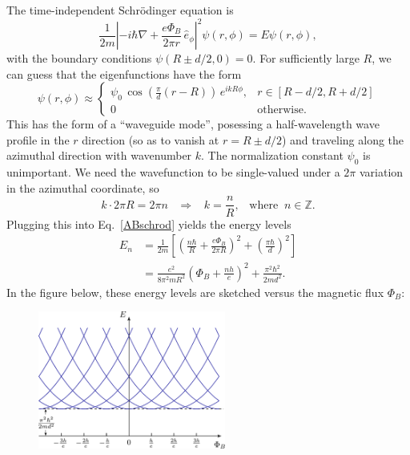 \documentclass[pra,12pt]{revtex4}
\begin{document}
The time-independent Schr\"odinger equation is
\begin{equation}
  \frac{1}{2m}\left|-i\hbar\nabla+
  \frac{e\Phi_B}{2\pi r} \, \hat{e}_\phi\right|^2 \psi(r,\phi)
  = E\psi(r,\phi),
  \label{ABschrod}
\end{equation}
with the boundary conditions $\psi(R\pm d/2,0) = 0$.  For sufficiently
large $R$, we can guess that the eigenfunctions have the form
\begin{equation}
  \psi(r,\phi) \approx
  \begin{cases}
  \psi_0 \, \cos\left(\frac{\pi}{d}(r-R)\right)\, e^{i k R \phi},
  & r \in [R-d/2, R + d/2] \\
  0 & \textrm{otherwise}.
  \end{cases}
\end{equation}
This has the form of a ``waveguide mode'', posessing a half-wavelength
wave profile in the $r$ direction (so as to vanish at $r = R \pm d/2$)
and traveling along the azimuthal direction with wavenumber $k$.  The
normalization constant $\psi_0$ is unimportant.  We need the
wavefunction to be single-valued under a $2\pi$ variation in the
azimuthal coordinate, so
\begin{equation}
  k \cdot 2\pi R = 2\pi n \;\;\;\Rightarrow \;\;\; k = \frac{n}{R},
  \;\;\;\mathrm{where}\;\; n \in \mathbb{Z}.
\end{equation}
Plugging this into Eq.~\eqref{ABschrod} yields the energy levels
\begin{align}
  E_n &= \frac{1}{2m} \left[
    \left(\frac{n\hbar}{R} + \frac{e\Phi_B}{2\pi R}\right)^2
    + \left(\frac{\pi\hbar}{d}\right)^2 \right] \\
  &= \frac{e^2}{8\pi^2mR^2} \left(\Phi_B + \frac{nh}{e} \right)^2
  + \frac{\pi^2\hbar^2}{2md^2}.
  \label{abcurves}
\end{align}
In the figure below, these energy levels are sketched versus the
magnetic flux $\Phi_B$:

\begin{figure}[h]
  \centering\includegraphics[width=0.55\textwidth]{abring}
\end{figure}
\end{document}
